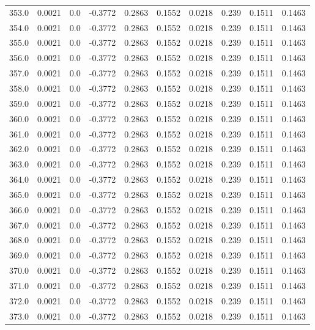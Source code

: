 \begin{longtable}{lrrrrrrrrr}
353.0 & 0.0021 & 0.0 & -0.3772 & 0.2863 & 0.1552 & 0.0218 & 0.239 & 0.1511 & 0.1463 \\
354.0 & 0.0021 & 0.0 & -0.3772 & 0.2863 & 0.1552 & 0.0218 & 0.239 & 0.1511 & 0.1463 \\
355.0 & 0.0021 & 0.0 & -0.3772 & 0.2863 & 0.1552 & 0.0218 & 0.239 & 0.1511 & 0.1463 \\
356.0 & 0.0021 & 0.0 & -0.3772 & 0.2863 & 0.1552 & 0.0218 & 0.239 & 0.1511 & 0.1463 \\
357.0 & 0.0021 & 0.0 & -0.3772 & 0.2863 & 0.1552 & 0.0218 & 0.239 & 0.1511 & 0.1463 \\
358.0 & 0.0021 & 0.0 & -0.3772 & 0.2863 & 0.1552 & 0.0218 & 0.239 & 0.1511 & 0.1463 \\
359.0 & 0.0021 & 0.0 & -0.3772 & 0.2863 & 0.1552 & 0.0218 & 0.239 & 0.1511 & 0.1463 \\
360.0 & 0.0021 & 0.0 & -0.3772 & 0.2863 & 0.1552 & 0.0218 & 0.239 & 0.1511 & 0.1463 \\
361.0 & 0.0021 & 0.0 & -0.3772 & 0.2863 & 0.1552 & 0.0218 & 0.239 & 0.1511 & 0.1463 \\
362.0 & 0.0021 & 0.0 & -0.3772 & 0.2863 & 0.1552 & 0.0218 & 0.239 & 0.1511 & 0.1463 \\
363.0 & 0.0021 & 0.0 & -0.3772 & 0.2863 & 0.1552 & 0.0218 & 0.239 & 0.1511 & 0.1463 \\
364.0 & 0.0021 & 0.0 & -0.3772 & 0.2863 & 0.1552 & 0.0218 & 0.239 & 0.1511 & 0.1463 \\
365.0 & 0.0021 & 0.0 & -0.3772 & 0.2863 & 0.1552 & 0.0218 & 0.239 & 0.1511 & 0.1463 \\
366.0 & 0.0021 & 0.0 & -0.3772 & 0.2863 & 0.1552 & 0.0218 & 0.239 & 0.1511 & 0.1463 \\
367.0 & 0.0021 & 0.0 & -0.3772 & 0.2863 & 0.1552 & 0.0218 & 0.239 & 0.1511 & 0.1463 \\
368.0 & 0.0021 & 0.0 & -0.3772 & 0.2863 & 0.1552 & 0.0218 & 0.239 & 0.1511 & 0.1463 \\
369.0 & 0.0021 & 0.0 & -0.3772 & 0.2863 & 0.1552 & 0.0218 & 0.239 & 0.1511 & 0.1463 \\
370.0 & 0.0021 & 0.0 & -0.3772 & 0.2863 & 0.1552 & 0.0218 & 0.239 & 0.1511 & 0.1463 \\
371.0 & 0.0021 & 0.0 & -0.3772 & 0.2863 & 0.1552 & 0.0218 & 0.239 & 0.1511 & 0.1463 \\
372.0 & 0.0021 & 0.0 & -0.3772 & 0.2863 & 0.1552 & 0.0218 & 0.239 & 0.1511 & 0.1463 \\
373.0 & 0.0021 & 0.0 & -0.3772 & 0.2863 & 0.1552 & 0.0218 & 0.239 & 0.1511 & 0.1463 \\

\end{longtable}
